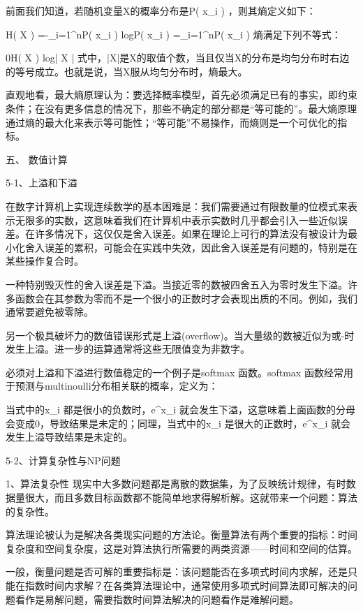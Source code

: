 \documentclass[11pt]{book}
\newcounter{#2}
\newcounter{#2}[#1]
\numberwithin{#2}{#1}
\begin{document}
前面我们知道，若随机变量X的概率分布是P\left( x_{i}  \right) ，则其熵定义如下：

H\left( X \right) =-\sum_{i=1}^{n}{P\left( x_{i}  \right) logP\left( x_{i}  \right) } =\sum_{i=1}^{n}{P\left( x_{i}  \right)  } 
熵满足下列不等式：

0\leq H\left( X \right) \leq log\left| X \right| 
式中，|X|是X的取值个数，当且仅当X的分布是均匀分布时右边的等号成立。也就是说，当X服从均匀分布时，熵最大。

直观地看，最大熵原理认为：要选择概率模型，首先必须满足已有的事实，即约束条件；在没有更多信息的情况下，那些不确定的部分都是“等可能的”。最大熵原理通过熵的最大化来表示等可能性；“等可能”不易操作，而熵则是一个可优化的指标。


五、 数值计算

5-1、上溢和下溢

在数字计算机上实现连续数学的基本困难是：我们需要通过有限数量的位模式来表示无限多的实数，这意味着我们在计算机中表示实数时几乎都会引入一些近似误差。在许多情况下，这仅仅是舍入误差。如果在理论上可行的算法没有被设计为最小化舍入误差的累积，可能会在实践中失效，因此舍入误差是有问题的，特别是在某些操作复合时。

一种特别毁灭性的舍入误差是下溢。当接近零的数被四舍五入为零时发生下溢。许多函数会在其参数为零而不是一个很小的正数时才会表现出质的不同。例如，我们通常要避免被零除。

另一个极具破坏力的数值错误形式是上溢(overflow)。当大量级的数被近似为\varpi 或-\varpi 时发生上溢。进一步的运算通常将这些无限值变为非数字。

必须对上溢和下溢进行数值稳定的一个例子是softmax 函数。softmax 函数经常用于预测与multinoulli分布相关联的概率，定义为：

当式中的x_{i} 都是很小的负数时，e^{x_{i} } 就会发生下溢，这意味着上面函数的分母会变成0，导致结果是未定的；同理，当式中的x_{i} 是很大的正数时，e^{x_{i} } 就会发生上溢导致结果是未定的。

5-2、计算复杂性与NP问题

1、算法复杂性
现实中大多数问题都是离散的数据集，为了反映统计规律，有时数据量很大，而且多数目标函数都不能简单地求得解析解。这就带来一个问题：算法的复杂性。

算法理论被认为是解决各类现实问题的方法论。衡量算法有两个重要的指标：时间复杂度和空间复杂度，这是对算法执行所需要的两类资源——时间和空间的估算。

一般，衡量问题是否可解的重要指标是：该问题能否在多项式时间内求解，还是只能在指数时间内求解？在各类算法理论中，通常使用多项式时间算法即可解决的问题看作是易解问题，需要指数时间算法解决的问题看作是难解问题。
\end{document}
